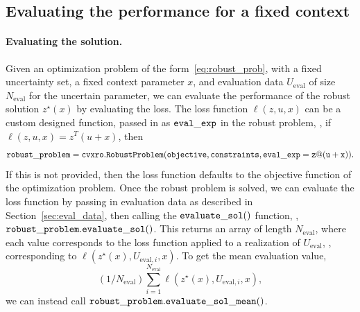 \subsection{Evaluating the performance for a fixed context}
\label{sec:fixed_context}
\paragraph{Evaluating the solution.} Given an optimization problem of the form~\eqref{eq:robust_prob}, with a fixed uncertainty set, a fixed context parameter $x$, and evaluation data $U_\text{eval}$ of size $N_{\text{eval}}$ for the uncertain parameter, we can evaluate the performance of the robust solution $z^\star(x)$ by evaluating the loss. The loss function $\ell(z,u,x)$ can be a custom designed function, passed in as $\tt{eval\_exp}$ in the robust problem, \ie , if $\ell(z,u,x) = z^T(u+x)$, then
$$\tt{robust\_problem = cvxro.RobustProblem(objective,constraints,eval\_exp = z@(u+x))}.$$
If this is not provided, then the loss function defaults to the objective function of the optimization problem. Once the robust problem is solved, we can evaluate the loss function by passing in evaluation data as described in Section~\ref{sec:eval_data}, then calling the $\tt{evaluate\_sol()}$ function, \ie, $\tt{robust\_problem.evaluate\_sol()}$.
This returns an array of length $N_{\text{eval}}$, where each value corresponds to the loss function applied to a realization of $U_\text{eval}$, \ie, corresponding to $\ell(z^\star(x),U_{\text{eval},i},x)$. To get the mean evaluation value, $$(1/N_{\text{eval}})\sum_{i=1}^{N_{\text{eval}}}\ell(z^\star(x),U_{\text{eval},i},x),$$ we can instead call $\tt{robust\_problem.evaluate\_sol\_mean()}$.


